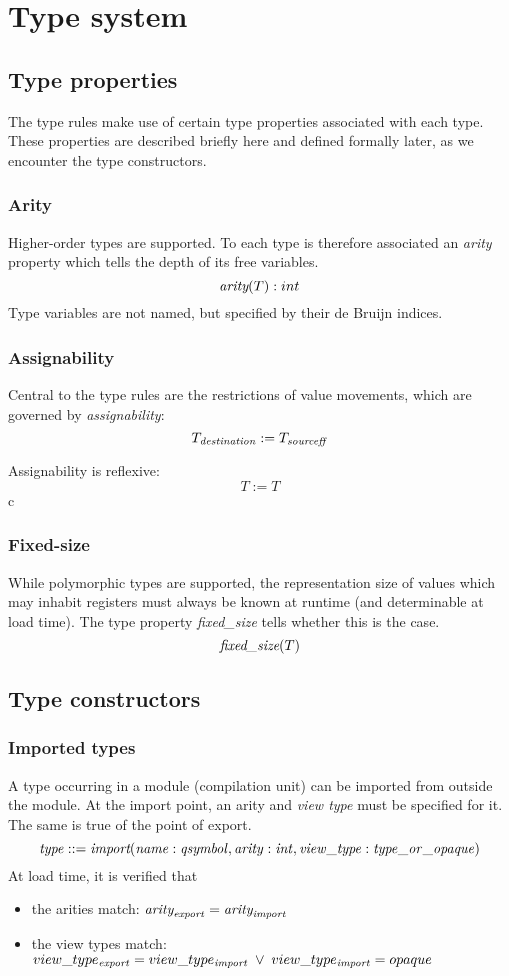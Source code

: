 \documentclass[a4paper]{report}
\newcommand\arity{{\ensuremath\textit{arity}}}
\newcommand\fixedsize{{\ensuremath\textit{fixed\_size}}}
\newcommand\tyImport{{\ensuremath\textit{import}}}
\begin{document}
\chapter{Type system}
\label{chap:typesystem}

\section{Type properties}

The type rules make use of certain type properties associated with each type.
These properties are described briefly here and defined formally later,
as we encounter the type constructors.

\subsection{Arity}
Higher-order types are supported. To each type is therefore associated
an \emph{arity} property which tells the depth of its free variables.
$$
\arity(T) : int
$$
Type variables are not named, but specified by their de Bruijn indices.

\subsection{Assignability}
Central to the type rules are the restrictions of value movements,
which are governed by \emph{assignability}:
$$
T_{\it destination} := T_{\it sourceff}
$$

Assignability is reflexive:
$$T := T$$c

\subsection{Fixed-size}
While polymorphic types are supported, the representation size of values
which may inhabit registers must always be known at runtime (and
determinable at load time).
The type property \emph{fixed\_size} tells whether this is the case.
$$
\fixedsize(T)
$$

\section{Type constructors}

\subsection{Imported types}
A type occurring in a module (compilation unit) can be imported from
outside the module.
At the import point, an arity and \emph{view type} must be specified for it.
The same is true of the point of export.
$$
\it type ::= \tyImport(name : qsymbol, arity : int, view\_type : type\_or\_opaque)
$$
At load time, it is verified that
\begin{itemize}
\item the arities match: $\arity_{\it export} = \arity_{\it import}$
\item the view types match:\\
$view\_type_{\it export} = view\_type_{\it import} \;\lor\; view\_type_{\it import} = opaque$
\end{itemize}
\end{document}
